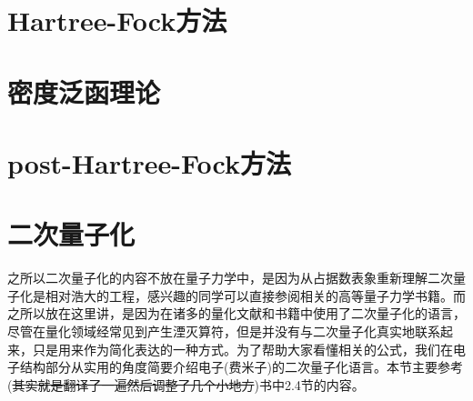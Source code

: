 \documentclass[12pt,a4paper,openany,twoside]{book}
\numberwithin{equation}{section}
\begin{document}
      \section{Hartree-Fock方法}
      \section{密度泛函理论}
      \section{post-Hartree-Fock方法}
      \section{二次量子化}
        之所以二次量子化的内容不放在量子力学中，是因为从占据数表象重新理解二次量子化是相对浩大的工程，感兴趣的同学可以直接参阅相关的高等量子力学书籍。而之所以放在这里讲，是因为在诸多的量化文献和书籍中使用了二次量子化的语言，尽管在量化领域经常见到产生湮灭算符，但是并没有与二次量子化真实地联系起来，只是用来作为简化表达的一种方式。为了帮助大家看懂相关的公式，我们在电子结构部分从实用的角度简要介绍电子(费米子)的二次量子化语言。本节主要参考(\sout{其实就是翻译了一遍然后调整了几个小地方})\cite{Szabo1989Modern}书中2.4节的内容。
\end{document}
